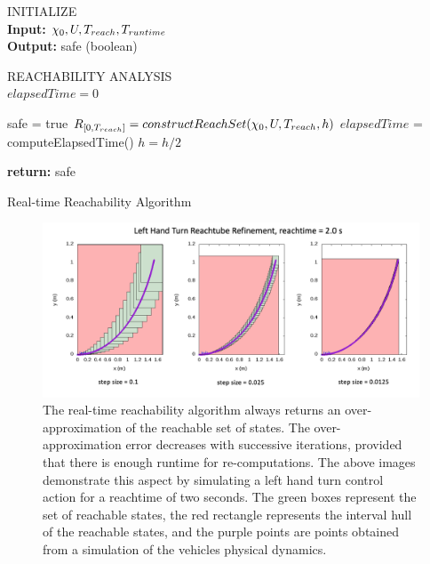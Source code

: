 \documentclass[manuscript,screen,review]{acmart}
\begin{document}
\begin{algorithm}[]%
\DontPrintSemicolon 
INITIALIZE{
\\
\textbf{Input:} $\chi_0,\mathnormal{U},T_{reach}, T_{runtime}$ \\
\textbf{Output:} safe (boolean)
}

\vspace{2mm}

REACHABILITY ANALYSIS\\
$elapsedTime = 0$\;
 {
    safe = true\;
    $\mathnormal{R}_{[0,T_{reach}]}= constructReachSet(\chi_0,\mathnormal{U},T_{reach},h)$\;
    $elapsedTime$ = computeElapsedTime()\;
    $h = h /2$\;
    
    
    
}
\textbf{return:} safe
\caption{Real-time Reachability Algorithm}
\label{alg:algo_rtreach}
\end{algorithm}%



\begin{figure}[htbp]%
  \centering
  \includegraphics[width=\linewidth]{figures/refinement_reachset.png}
  \caption{The real-time reachability algorithm always returns an over-approximation of the reachable set of states. The over-approximation error decreases with successive iterations, provided that there is enough runtime for re-computations. The above images demonstrate this aspect by simulating a left hand turn control action for a reachtime of two seconds. The green boxes represent the set of reachable states, the red rectangle represents the interval hull of the reachable states, and the purple points are points obtained from a simulation of the vehicles physical dynamics.}
  \label{fig:reach_refine}
\end{figure}%
\end{document}
